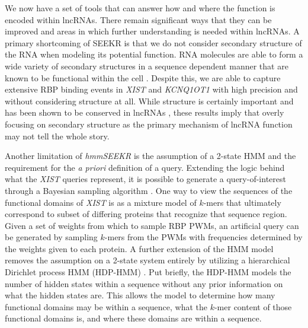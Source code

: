 We now have a set of tools that can answer how and where the function is encoded within lncRNAs. There remain significant ways that they can be improved and areas in which further understanding is needed within lncRNAs. A primary shortcoming of SEEKR is that we do not consider secondary structure of the RNA when modeling its potential function. RNA molecules are able to form a wide variety of secondary structures in a sequence dependent manner that are known to be functional within the cell \cite{Siegfried2014RNASHAPE-MaP,Wan2011UnderstandingStructure}. Despite this, we are able to capture extensive RBP binding events in \emph{XIST} and \emph{KCNQ1OT1} with high precision and without considering structure at all. While structure is certainly important and has been shown to be conserved in lncRNAs \cite{Johnsson2014EvolutionaryFunction}, these results imply that overly focusing on secondary structure as the primary mechanism of lncRNA function may not tell the whole story.

Another limitation of \emph{hmmSEEKR} is the assumption of a 2-state HMM and the requirement for the \emph{a priori} definition of a query. Extending the logic behind what the \emph{XIST} queries represent, it is possible to generate a query-of-interest through a Bayesian sampling algorithm \cite{McLachlan2019FiniteModels}. One way to view the sequences of the functional domains of \emph{XIST} is as a mixture model of $k$-mers that ultimately correspond to subset of differing proteins that recognize that sequence region. Given a set of weights from which to sample RBP PWMs, an artificial query can be generated by sampling $k$-mers from the PWMs with frequencies determined by the weights given to each protein. A further extension of the HMM model removes the assumption on a 2-state system entirely by utilizing a hierarchical Dirichlet process HMM (HDP-HMM) \cite{Johnson2013BayesianModels}. Put briefly, the HDP-HMM models the number of hidden states within a sequence without any prior information on what the hidden states are. This allows the model to determine how many functional domains may be within a sequence, what the $k$-mer content of those functional domains is, and where these domains are within a sequence. 

